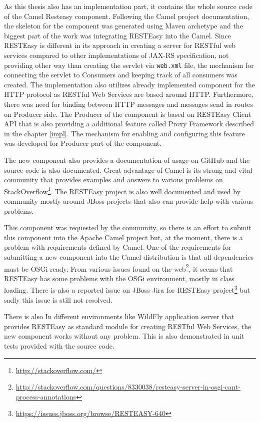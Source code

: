 \documentclass[12pt,final,oneside]{fithesis2}
\begin{document}
As this thesis also has an implementation part, it contains the whole source code of the Camel Resteasy component. Following  the Camel project documentation, the skeleton for the component was generated using Maven archetype and the biggest part of the work was integrating RESTEasy into the Camel. Since RESTEasy is different in its approach in creating a server for RESTful web services compared to other implementations of JAX-RS specification, not providing other way than creating the servlet via \texttt{web.xml} file, the mechanism for connecting the servlet to Consumers and keeping track of all consumers was created. The implementation also utilizes already implemented component for the HTTP protocol as RESTful Web Services are based around HTTP. Furthermore, there was need for binding between HTTP messages and messages send in routes on Producer side. The Producer of the component is based on RESTEasy Client API that is also providing a additional feature called Proxy Framework described in the chapter \ref{impl}. The mechanism for enabling and configuring this feature was developed for Producer part of the component.

The new component also provides a documentation of usage on GitHub and the source code is also documented. Great advantage of Camel is its strong and vital community that provides examples and answers to various problems on StackOverflow\footnote{\url{http://stackoverflow.com/}}. The RESTEasy project is also well documented and used by community mostly around JBoss projects that also can provide help with various problems.

This component was requested by the community, so there is an effort to submit this component into the Apache Camel project but, at the moment, there is a problem with requirements defined by Camel. One of the requirements for submitting a new component into the Camel distribution is that all dependencies must be OSGi ready. From various issues found on the web\footnote{\url{http://stackoverflow.com/questions/8330038/resteasy-server-in-osgi-cant-process-annotations}}, it seems that RESTEasy has some problems with the OSGi environment, mostly in class loading. There is also a reported issue on JBoss Jira for RESTEasy project\footnote{\url{https://issues.jboss.org/browse/RESTEASY-640}} but sadly this issue is still not resolved.

There is also  In different environments like WildFly application server that provides RESTEasy as standard module for creating RESTful Web Services, the new component works without any problem. This is also demonstrated in unit tests provided with the source code. 
\end{document}
